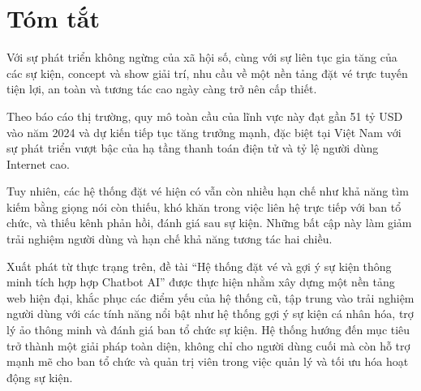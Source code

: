 \section*{Tóm tắt}
\thispagestyle{empty}
\indent \indent Với sự phát triển không ngừng của xã hội số, cùng với sự liên tục gia tăng của các sự kiện, concept và show giải trí, nhu cầu về một nền tảng đặt vé trực tuyến tiện lợi, an toàn và tương tác cao ngày càng trở nên cấp thiết. 

Theo báo cáo thị trường, quy mô toàn cầu của lĩnh vực này đạt gần 51 tỷ USD vào năm 2024 và dự kiến tiếp tục tăng trưởng mạnh, đặc biệt tại Việt Nam với sự phát triển vượt bậc của hạ tầng thanh toán điện tử và tỷ lệ người dùng Internet cao.

Tuy nhiên, các hệ thống đặt vé hiện có vẫn còn nhiều hạn chế như khả năng tìm kiếm bằng giọng nói còn thiếu, khó khăn trong việc liên hệ trực tiếp với ban tổ chức, và thiếu kênh phản hồi, đánh giá sau sự kiện. Những bất cập này làm giảm trải nghiệm người dùng và hạn chế khả năng tương tác hai chiều.

Xuất phát từ thực trạng trên, đề tài “Hệ thống đặt vé và gợi ý sự kiện thông minh tích hợp hợp Chatbot AI” được thực hiện nhằm xây dựng một nền tảng web hiện đại, khắc phục các điểm yếu của hệ thống cũ, 
tập trung vào trải nghiệm người dùng với các tính năng nổi bật như hệ thống gợi ý sự kiện cá nhân hóa, trợ lý ảo thông minh và đánh giá ban tổ chức sự kiện. Hệ thống hướng đến mục tiêu trở thành một giải pháp toàn diện, không chỉ cho người dùng cuối mà còn hỗ trợ mạnh mẽ cho ban tổ chức và quản trị viên trong việc quản lý và tối ưu hóa hoạt động sự kiện.

\clearpage
{}